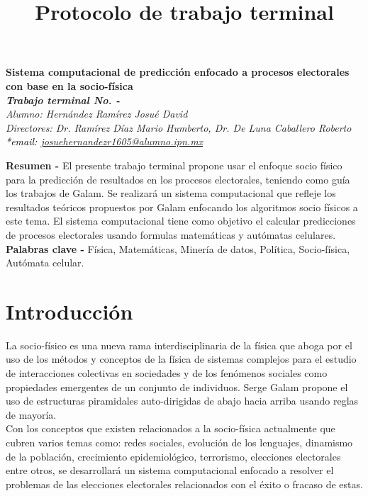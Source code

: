 \documentclass[letterpaper, 10pt]{article}
\title{Protocolo de trabajo terminal}
\def\letra#1#2{%
\tamanyo=#1%
\interlinea=1.2\tamanyo%
\fontfamily{ptm}
\fontsize{\the\tamanyo}%
{\the\interlinea}\selectfont#2}
\begin{document}
\begin{center}
    \letra{14pt}{\textbf{Sistema computacional de predicción enfocado a procesos electorales con base en la socio-física}}\\
    \letra{12pt}{\textbf{\textit{Trabajo terminal No. -}}} \\
    \letra{12pt}{\textit{Alumno: Hernández Ramírez Josué David}} \\
    \letra{12pt}{\textit{Directores: Dr. Ramírez Díaz Mario Humberto, Dr. De Luna Caballero Roberto}} \\
    \letra{12pt}{\textcolor{black}{\textit{*email: \url{josuehernandezr1605@alumno.ipn.mx}}}}
\end{center}

\textbf{Resumen -} El presente trabajo terminal propone usar el enfoque socio físico para la predicción de resultados en los procesos electorales, teniendo como guía los trabajos de Galam.  Se realizará un sistema computacional que refleje los resultados teóricos propuestos por Galam enfocando los algoritmos socio físicos a este tema. El sistema computacional tiene como objetivo el calcular predicciones de procesos electorales usando formulas matemáticas y autómatas celulares.
\newline
\textbf{Palabras clave -} Física, Matemáticas, Minería de datos, Política, Socio-física, Autómata celular.

\section{Introducción}

La socio-físico es una nueva rama interdisciplinaria de la física que aboga por el uso de los métodos y conceptos de la física de sistemas complejos para el estudio de interacciones colectivas en sociedades y de los fenómenos sociales como propiedades emergentes de un conjunto de individuos. Serge Galam propone el uso de estructuras piramidales auto-dirigidas de abajo hacia arriba usando reglas de mayoría. \cite{MarioH.RamirezDiaz2014, Galam.1986, Galam1990, Galam1991, Galam2000}
\\
\vspace{5mm} %
Con los conceptos que existen relacionados a la socio-física actualmente que cubren varios temas como: redes sociales, evolución de los lenguajes, dinamismo de la población, crecimiento epidemiológico, terrorismo, elecciones electorales entre otros, se desarrollará un sistema computacional enfocado a resolver el problemas de las elecciones electorales relacionados con el éxito o fracaso de estas.
\end{document}
